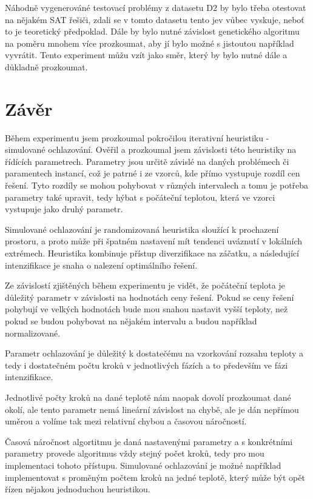 \documentclass[11pt]{article}
\begin{document}
Náhodně vygenerováné testovací problémy z datasetu D2 by bylo třeba otestovat na nějakém SAT řešiči, zdali se v tomto datasetu tento jev vůbec vyskuje, neboť to je teoretický předpoklad. Dále by bylo nutné závislost genetického algoritmu na poměru mnohem více prozkoumat, aby jí bylo možné s jistoutou například vyvrátit. Tento experiment můžu vzít jako směr, který by bylo nutné dále a důkladně prozkoumat.

\section{Závěr}\label{kap:zaver}
Během experimentu jsem prozkoumal pokročilou iterativní heuristiku - simulované ochlazování. Ověřil a prozkoumal jsem závislosti této heuristiky na řídících parametrech. Parametry jsou určitě závislé na daných problémech či paramentech instancí, což je patrné i ze vzorců, kde přímo vystupuje rozdíl cen řešení. Tyto rozdíly se mohou pohybovat v různých intervalech a tomu je potřeba parametry také upravit, tedy hýbat s počáteční teplotou, která ve vzorci vystupuje jako druhý parametr. 

Simulované ochlazování je randomizovaná heuristika sloužící k prochazení prostoru, a proto může při špatném nastavení mít tendenci uváznutí v lokálních extrémech. Heuristika kombinuje přístup diverzifikace na záčatku, a následující intenzifikace je snaha o nalezení optimálního řešení. 

Ze závislostí zjištěných během experimentu je vidět, že počáteční teplota je důležitý parametr v závislosti na hodnotách ceny řešení. Pokud se ceny řešení pohybují ve velkých hodnotách bude mou snahou nastavit vyšší teploty, než pokud se budou pohybovat na nějakém intervalu a budou například normalizované. 

Parametr ochlazování je důležitý k dostatečému na vzorkování rozsahu teploty a tedy i dostatečném počtu kroků v jednotlivých fázích a to především ve fázi intenzifikace. 

Jednotlivé počty kroků na dané teplotě nám naopak dovolí prozkoumat dané okolí, ale tento parametr nemá lineární závislost na chybě, ale je dán nepřímou uměrou a volíme tak mezi relativní chybou a časovou náročností. 

Časová náročnost algortitmu je daná nastavenými parametry a s konkrétními parametry provede algoritmus vždy stejný počet kroků, tedy pro mou implementaci tohoto přístupu. Simulované ochlazování je možné například implementovat s proměným počtem kroků na jedné teplotě, který může být opět řízen nějakou jednoduchou heuristikou.
\end{document}

